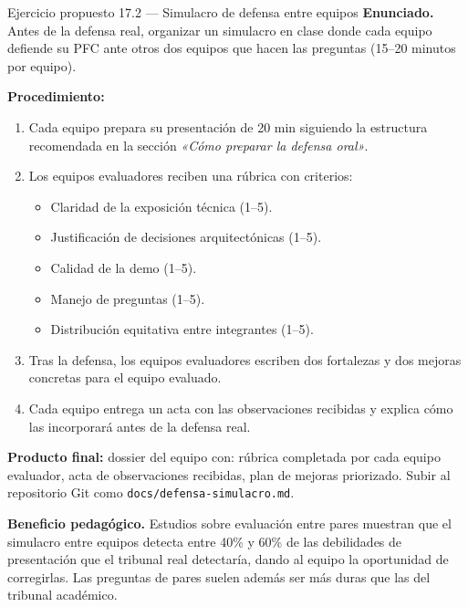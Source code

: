 \documentclass[11pt,a4paper,openany]{book}
\begin{document}
\begin{cajaejercicio}{Ejercicio propuesto 17.2 --- Simulacro de defensa entre equipos}
\textbf{Enunciado.} Antes de la defensa real, organizar un simulacro
en clase donde cada equipo defiende su PFC ante otros dos equipos que
hacen las preguntas (15--20 minutos por equipo).

\textbf{Procedimiento:}
\begin{enumerate}
\item Cada equipo prepara su presentación de 20 min siguiendo la
estructura recomendada en la sección \emph{«Cómo preparar la defensa
oral»}.
\item Los equipos evaluadores reciben una rúbrica con criterios:
\begin{itemize}
\item Claridad de la exposición técnica (1--5).
\item Justificación de decisiones arquitectónicas (1--5).
\item Calidad de la demo (1--5).
\item Manejo de preguntas (1--5).
\item Distribución equitativa entre integrantes (1--5).
\end{itemize}
\item Tras la defensa, los equipos evaluadores escriben dos
fortalezas y dos mejoras concretas para el equipo evaluado.
\item Cada equipo entrega un acta con las observaciones recibidas y
explica cómo las incorporará antes de la defensa real.
\end{enumerate}

\textbf{Producto final:} dossier del equipo con: rúbrica completada
por cada equipo evaluador, acta de observaciones recibidas, plan de
mejoras priorizado. Subir al repositorio Git como
\texttt{docs/defensa-simulacro.md}.

\textbf{Beneficio pedagógico.} Estudios sobre evaluación entre pares
\cite{washizaki2024swebok} muestran que el simulacro entre equipos
detecta entre 40\% y 60\% de las debilidades de presentación que el
tribunal real detectaría, dando al equipo la oportunidad de
corregirlas. Las preguntas de pares suelen además ser más duras que
las del tribunal académico.
\end{cajaejercicio}

\end{document}
